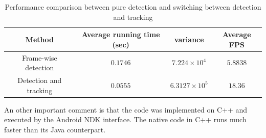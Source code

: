 \begin{table}
\begin{tabular}{|c|c|c|c|}
    \hline
    Method & Average running time (sec) & variance & Average FPS \\
    \hline
    Frame-wise detection & $0.1746$ & $7.224 \times 10^4$ & $5.8838$ \\
    \hline
    Detection and tracking  & $0.0555$ & $6.3127 \times 10^5$ & $18.36$ \\
    \hline
\end{tabular}
    \caption{Performance comparison between pure detection and switching between
    detection and tracking}
    \label{tab:detectionvstracking}
\end{table}

An other important comment is that the code was implemented on C++ and executed
by the Android NDK interface. The native code in C++ runs much faster than its
Java counterpart.



